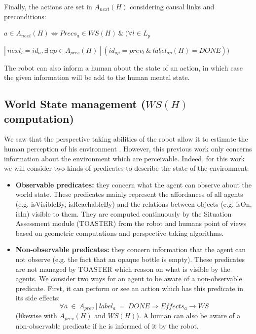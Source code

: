 \documentclass[english,a4paper,11pt,twoside]{StyleThese}
\begin{document}
Finally, the actions are set in $A_{next}(H)$ considering causal links and preconditions:

\begin{center}
$a \in A_{next}(H) \Leftrightarrow Precs_{a} \in WS(H) \ \& \ (\forall l \in L_p$ 

$| \ next_l = id_a, \exists \ ap \in A_{prev}(H) \ | \ (id_{ap} = prev_l \ \& \ label_{ap}(H)  = DONE))$
\end{center}

The robot can also inform a human about the state of an action, in which case the given information will be add to the human mental state.

\subsection{World State management ($WS(H)$ computation)}
\label{subsec:worldstate}

We saw that the perspective taking abilities of the robot allow it to estimate the human perception of his environment \cite{milliez2014framework}. However, this previous work only concerns information about the environment which are perceivable. Indeed, for this work we will consider two kinds of predicates to describe the state of the environment:
\begin{itemize}
\item \textbf{Observable predicates:} they concern what the agent can observe about the world state. These predicates mainly represent the affordances of all agents (e.g. isVisibleBy, isReachableBy) and the relations between objects (e.g. isOn, isIn) visible to them. They are computed continuously by the Situation Assessment module (TOASTER) from the robot and humans point of views based on geometric computations and perspective taking algorithms.
\item \textbf{Non-observable predicates:} they concern information that the agent can not observe (e.g. the fact that an opaque bottle is empty). These predicates are not managed by TOASTER which reason on what is visible by the agents. We consider two ways for an agent to be aware of a non-observable predicate. First, it can perform or see an action which has this predicate in its side effects:
$$\forall a \ \in \ A_{prev} \ | \ label_{a} \ = \ DONE \Rightarrow Effects_{a} \rightarrow WS$$
(likewise with $A_{prev}(H)$ and $WS(H)$). A human can also be aware of a non-observable predicate if he is informed of it by the robot.
\end{itemize}
\end{document}
